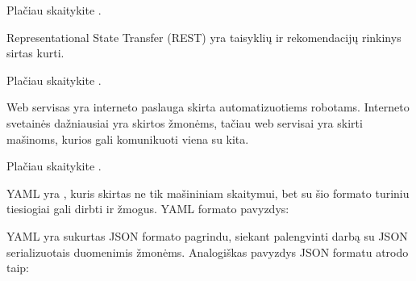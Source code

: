 \documentclass[letterpaper,10pt,lithuanian]{sphinxmanual}
\begin{document}
\begin{description}
\sphinxAtStartPar
Plačiau skaitykite .

\sphinxAtStartPar
Representational State Transfer (REST) yra taisyklių ir rekomendacijų
rinkinys sirtas {\hyperref[\detokenize{savokos:term-web-servisas}]{}} kurti.

\sphinxAtStartPar
Plačiau skaitykite .

\sphinxAtStartPar
Web servisas yra interneto paslauga skirta automatizuotiems robotams.
Interneto svetainės dažniausiai yra skirtos žmonėms, tačiau web servisai
yra skirti mašinoms, kurios gali komunikuoti viena su kita.

\sphinxAtStartPar
Plačiau skaitykite .

\sphinxAtStartPar
YAML yra {\hyperref[\detokenize{savokos:term-duomenu-serializavimo-formatas}]{}}, kuris skirtas ne tik
mašininiam skaitymui, bet su šio formato turiniu tiesiogiai gali dirbti
ir žmogus. YAML formato pavyzdys:

\begin{sphinxVerbatim}[commandchars=\\\{\}]
\end{sphinxVerbatim}

\sphinxAtStartPar
YAML yra sukurtas JSON formato pagrindu, siekant palengvinti darbą su
JSON serializuotais duomenimis žmonėms. Analogiškas pavyzdys JSON formatu
atrodo taip:

\begin{sphinxVerbatim}[commandchars=\\\{\}]
\end{sphinxVerbatim}


\end{description}
\end{document}
